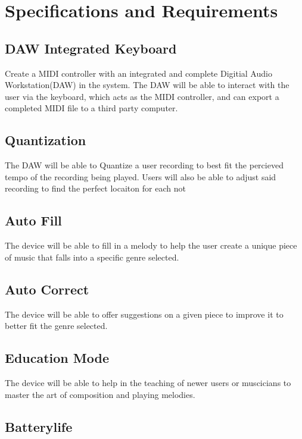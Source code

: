 \section{Specifications and Requirements}

\subsection{DAW Integrated Keyboard}

Create a MIDI controller with an integrated and complete Digitial Audio
Workstation(DAW) in the system. The DAW will be able to interact with the user
via the keyboard, which acts as the MIDI controller, and can export a completed
MIDI file to a third party computer.

\subsection{Quantization}

The DAW will be able to Quantize a user recording to best fit the percieved
tempo of the recording being played. Users will also be able to adjust said
recording to find the perfect locaiton for each not

\subsection{Auto Fill}

The device will be able to fill in a melody to help the user create a unique
piece of music that falls into a specific genre selected.

\subsection{Auto Correct}

The device will be able to offer suggestions on a given piece to improve it to
better fit the genre selected.

\subsection{Education Mode}

The device will be able to help in the teaching of newer users or muscicians to
master the art of composition and playing melodies.

\subsection{Batterylife}

